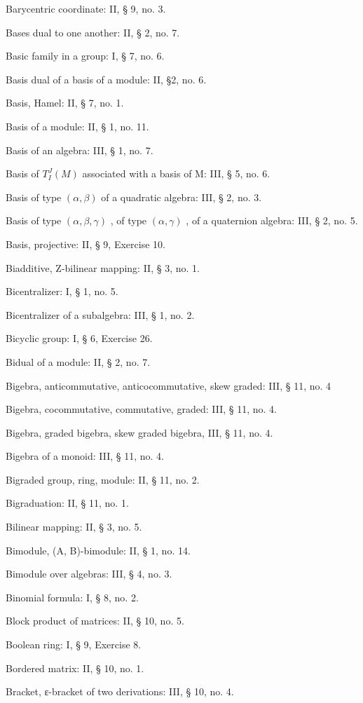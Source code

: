 Barycentric coordinate: II, § 9, no. 3.

Bases dual to one another: II, § 2, no. 7.

Basic family in a group: I, § 7, no. 6.

Basis dual of a basis of a module: II, §2, no. 6.

Basis, Hamel: II, § 7, no. 1.

Basis of a module: II, § 1, no. 11.

Basis of an algebra: III, § 1, no. 7.

Basis of \(T_{I}^{J}(M)\) associated with a basis of M: III, § 5, no. 6.

Basis of type \((\alpha, \beta)\) of a quadratic algebra: III, § 2, no. 3.

Basis of type \((\alpha, \beta, \gamma)\) , of type \((\alpha, \gamma)\) , of a quaternion algebra: III, § 2, no. 5.

Basis, projective: II, § 9, Exercise 10.

Biadditive, Z-bilinear mapping: II, § 3, no. 1.

Bicentralizer: I, § 1, no. 5.

Bicentralizer of a subalgebra: III, § 1, no. 2.

Bicyclic group: I, § 6, Exercise 26.

Bidual of a module: II, § 2, no. 7.

Bigebra, anticommutative, anticocommutative, skew graded: III, § 11, no. 4

Bigebra, cocommutative, commutative, graded: III, § 11, no. 4.

Bigebra, graded bigebra, skew graded bigebra, III, § 11, no. 4.

Bigebra of a monoid: III, § 11, no. 4.

Bigraded group, ring, module: II, § 11, no. 2.

Bigraduation: II, § 11, no. 1.

Bilinear mapping: II, § 3, no. 5.

Bimodule, (A, B)-bimodule: II, § 1, no. 14.

Bimodule over algebras: III, § 4, no. 3.

Binomial formula: I, § 8, no. 2.

Block product of matrices: II, § 10, no. 5.

Boolean ring: I, § 9, Exercise 8.

Bordered matrix: II, § 10, no. 1.

Bracket, ε-bracket of two derivations: III, § 10, no. 4.

